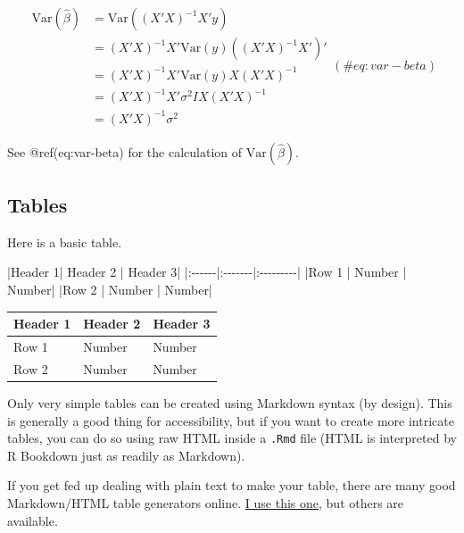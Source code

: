 \documentclass[
  letterpaper,
]{article}
\newenvironment{Shaded}{\begin{snugshade}}{\end{snugshade}}
\newcommand{\NormalTok}[1]{\textcolor[rgb]{0.00,0.23,0.31}{#1}}
\numberwithin{equation}{section}
\numberwithin{figure}{section}
\theoremstyle{break}
\begin{document}
\begin{equation} 
\begin{split}
\mathrm{Var}(\hat{\beta}) & =\mathrm{Var}((X'X)^{-1}X'y)\\
 & =(X'X)^{-1}X'\mathrm{Var}(y)((X'X)^{-1}X')'\\
 & =(X'X)^{-1}X'\mathrm{Var}(y)X(X'X)^{-1}\\
 & =(X'X)^{-1}X'\sigma^{2}IX(X'X)^{-1}\\
 & =(X'X)^{-1}\sigma^{2}
\end{split}
(\#eq:var-beta)
\end{equation}

See @ref(eq:var-beta) for the calculation of
\(\mathrm{Var}(\hat{\beta})\).

\subsection{Tables}\label{tables}

Here is a basic table.

\begin{Shaded}
\begin{Highlighting}[]
\NormalTok{|Header 1| Header 2 | Header 3|}
\NormalTok{|:{-}{-}{-}{-}{-}{-}|:{-}{-}{-}{-}{-}{-}{-}|:{-}{-}{-}{-}{-}{-}{-}{-}{-}|}
\NormalTok{|Row 1 | Number | Number|}
\NormalTok{|Row 2 | Number | Number|}
\end{Highlighting}
\end{Shaded}

\begin{longtable}[]{@{}lll@{}}
\toprule\noalign{}
Header 1 & Header 2 & Header 3 \\
\midrule\noalign{}
\endhead
\bottomrule\noalign{}
\endlastfoot
Row 1 & Number & Number \\
Row 2 & Number & Number \\
\end{longtable}

Only very simple tables can be created using Markdown syntax (by
design). This is generally a good thing for accessibility, but if you
want to create more intricate tables, you can do so using raw HTML
inside a \texttt{.Rmd} file (HTML is interpreted by R Bookdown just as
readily as Markdown).

If you get fed up dealing with plain text to make your table, there are
many good Markdown/HTML table generators online.
\href{https://www.tablesgenerator.com/html_tables?target=_blank}{I use
this one}, but others are available.
\end{document}
